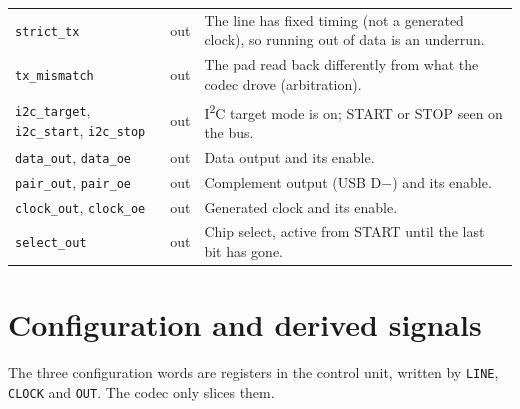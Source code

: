 \documentclass[11pt,a4paper]{article}
\newcommand{\sig}[1]{\texttt{#1}}
\begin{document}
\begin{longtable}{@{}l l p{8.4cm}@{}}
\sig{strict\_tx} & out & The line has fixed timing (not a generated clock), so running out of data is an underrun. \\
\sig{tx\_mismatch} & out & The pad read back differently from what the codec drove (arbitration). \\
\sig{i2c\_target}, \sig{i2c\_start}, \sig{i2c\_stop} & out & I\textsuperscript{2}C target mode is on; START or STOP seen on the bus. \\
\sig{data\_out}, \sig{data\_oe} & out & Data output and its enable. \\
\sig{pair\_out}, \sig{pair\_oe} & out & Complement output (USB D$-$) and its enable. \\
\sig{clock\_out}, \sig{clock\_oe} & out & Generated clock and its enable. \\
\sig{select\_out} & out & Chip select, active from START until the last bit has gone. \\
\bottomrule
\end{longtable}

\section{Configuration and derived signals}

The three configuration words are registers in the control unit, written by \sig{LINE}, \sig{CLOCK} and \sig{OUT}. The codec only slices them.
\end{document}
